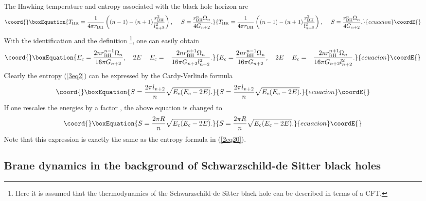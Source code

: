 \documentclass[a4paper,12pt]{article}
\begin{document}
  
The Hawking temperature \coordHE{} and entropy \coordHE{} associated with the
  black hole horizon are~\cite{Cai2}
  \begin{equation}\coord{}\boxEquation{
  \label{3eq2}
  T_{\rm HK} =\frac{1}{4\pi
  r_{\rm BH}}\left((n-1)-(n+1)\frac{r_{\rm BH}^2}{l^2_{n+2}}\right), \ \ \ \
 S =\frac{r_{\rm BH}^n \Omega_n}{4G_{n+2}}.
}{
  T_{\rm HK} =\frac{1}{4\pi
  r_{\rm BH}}\left((n-1)-(n+1)\frac{r_{\rm BH}^2}{l^2_{n+2}}\right), \ \ \ \
 S =\frac{r_{\rm BH}^n \Omega_n}{4G_{n+2}}.
}{ecuacion}\coordE{}\end{equation}
With the identification \myHighlight{$E=M$}\coordHE{} and the definition
\coordHE{}\footnote{Here it is assumed that the
thermodynamics of the Schwarzschild-de Sitter black hole can be
described in terms of a CFT.}, one can easily obtain
\begin{equation}\coord{}\boxEquation{
 E_c =\frac{2nr_{\rm BH}^{n-1}\Omega_n}{16\pi G_{n+2}}, \ \ \
 2E-E_c =-\frac{2n r_{\rm BH}^{n+1} \Omega_n}{16\pi G_{n+2}l^2_{n+2}}.
 }{
 E_c =\frac{2nr_{\rm BH}^{n-1}\Omega_n}{16\pi G_{n+2}}, \ \ \
 2E-E_c =-\frac{2n r_{\rm BH}^{n+1} \Omega_n}{16\pi G_{n+2}l^2_{n+2}}.
 }{ecuacion}\coordE{}\end{equation}
Clearly the entropy (\ref{3eq2}) can be expressed by the
Cardy-Verlinde formula~\cite{Cai2}
\begin{equation}\coord{}\boxEquation{
S =\frac{2\pi l_{n+2}}{n} \sqrt{E_c (E_c-2E)}.
}{
S =\frac{2\pi l_{n+2}}{n} \sqrt{E_c (E_c-2E)}.
}{ecuacion}\coordE{}\end{equation}
If one rescales the energies by a factor \coordHE{}, the above equation
is changed to
\begin{equation}\coord{}\boxEquation{
\label{3eq5} S =\frac{2\pi R}{n}\sqrt{E_c(E_c-2E)}.
}{
S =\frac{2\pi R}{n}\sqrt{E_c(E_c-2E)}.
}{ecuacion}\coordE{}\end{equation}
Note that this expression is  exactly the same as the entropy formula in
(\ref{2eq20}).


\subsection{Brane dynamics in the background of Schwarzschild-de
Sitter black holes}
\end{document}
